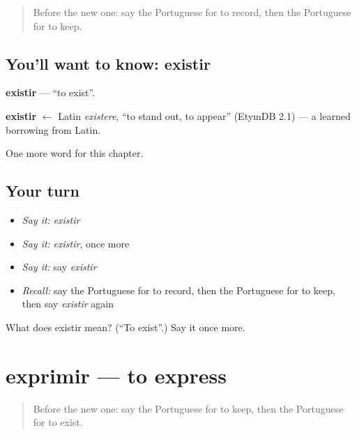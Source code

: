 \label{lesson:PT-C209-existir}



\begin{quote}
Before the new one: say the Portuguese for to record, then the Portuguese for to keep.
\end{quote}

\subsection*{You'll want to know: existir}
\textbf{existir} — \textquotedblleft{}to exist\textquotedblright{}.

\begin{cousinweb}
\textbf{existir} $\leftarrow$ Latin \emph{existere}, \textquotedblleft{}to stand out, to appear\textquotedblright{} (EtymDB 2.1) — a learned borrowing from Latin.
\end{cousinweb}

\begin{grammarlens}[title={What you've built}]
One more word for this chapter.
\end{grammarlens}

\subsection*{Your turn}
\begin{itemize}
\raggedright
  \item \emph{Say it:} \emph{existir}
  \item \emph{Say it:} \emph{existir}, once more
  \item \emph{Say it:} say \emph{existir}
  \item \emph{Recall:} say the Portuguese for to record, then the Portuguese for to keep, then say \emph{existir} again
\end{itemize}

\begin{tcolorbox}[breakable,colback=teal!4,colframe=teal!35!black,title={Before you move on}]
What does existir mean? (\textquotedblleft{}To exist\textquotedblright{}.) Say it once more.
\end{tcolorbox}
\section[exprimir]{exprimir — to express}

\label{lesson:PT-C209-exprimir}



\begin{quote}
Before the new one: say the Portuguese for to keep, then the Portuguese for to exist.
\end{quote}

